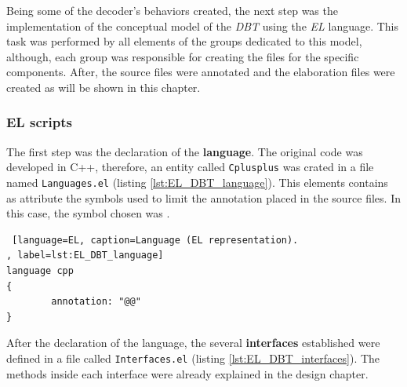 Being some of the decoder's behaviors created, the next step was the implementation of the conceptual model of the \textit{DBT} using the \textit{EL} language. This task was performed by all elements of the groups dedicated to this model, although, each group was responsible for creating the files for the specific components. After, the source files were  annotated and the elaboration files were created as will be shown in this chapter.

\subsubsection{EL scripts}

The first step was the declaration of the \textbf{language}. The original code was developed in C++, therefore, an entity called \texttt{Cplusplus} was crated in a file named \texttt{Languages.el} (listing \ref{lst:EL_DBT_language}). This elements contains as attribute the symbols used to limit the annotation placed in the source files. In this case, the symbol chosen was \texttt{\@\@}.


\begin{lstlisting} [language=EL, caption=Language (EL representation).
, label=lst:EL_DBT_language]
language cpp
{
		annotation: "@@"
}
\end{lstlisting}

After the declaration of the language, the several \textbf{interfaces} established were defined in a file called \texttt{Interfaces.el} (listing \ref{lst:EL_DBT_interfaces}). The methods inside each interface were already explained in the design chapter.

